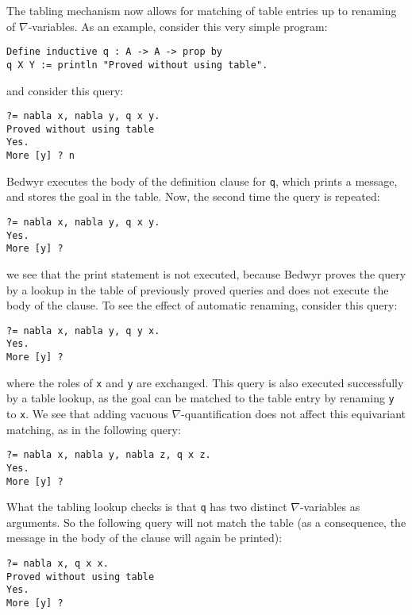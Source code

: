 \documentclass{article}
\newcommand\obj[1]{\texttt{#1}}
\begin{document}
The tabling mechanism now allows for matching of table entries up to renaming
of $\nabla$-variables. 
As an example, consider this very simple program:
\begin{verbatim}
Define inductive q : A -> A -> prop by
q X Y := println "Proved without using table".
\end{verbatim}
and consider this query:
\begin{verbatim}
?= nabla x, nabla y, q x y.
Proved without using table
Yes.
More [y] ? n
\end{verbatim}
Bedwyr executes the body of the definition clause for \obj{q}, 
which prints a message, and stores the goal in the table. 
Now, the second time the query is repeated: 
\begin{verbatim}
?= nabla x, nabla y, q x y.
Yes.
More [y] ?
\end{verbatim}
we see that the print statement is not executed, because Bedwyr 
proves the query by a lookup in the table of previously proved queries
and does not execute the body of the clause.
To see the effect of automatic renaming, consider this query:
\begin{verbatim}
?= nabla x, nabla y, q y x.
Yes.
More [y] ?
\end{verbatim} 
where the roles of \obj{x} and \obj{y} are exchanged. 
This query is also executed successfully by a table lookup, 
as the goal can be matched to the table entry 
by renaming \obj{y} to \obj{x}.
We see that adding vacuous $\nabla$-quantification 
does not affect this equivariant matching, as in the
following query:
\begin{verbatim}
?= nabla x, nabla y, nabla z, q x z.
Yes.
More [y] ? 
\end{verbatim}
What the tabling lookup checks is that \obj{q} has two distinct
$\nabla$-variables as arguments. So the following query
will not match the table (as a consequence, the message in the body
of the clause will again be printed): 
\begin{verbatim}
?= nabla x, q x x.
Proved without using table
Yes.
More [y] ?
\end{verbatim}

\end{document}
